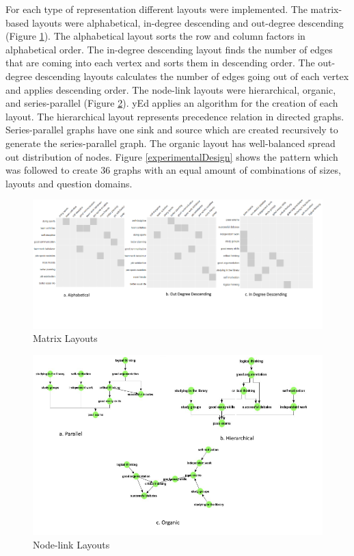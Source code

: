 \documentclass{l4proj}
\begin{document}
For each type of representation different layouts were implemented. The matrix-based layouts were alphabetical, in-degree descending and out-degree descending (Figure \ref{matrixLayout}). The alphabetical layout sorts the row and column factors in alphabetical order. The in-degree descending layout finds the number of edges that are coming into each vertex and sorts them in descending order. The out-degree descending layouts calculates the number of edges going out of each vertex and applies descending order.  The node-link layouts were hierarchical, organic, and series-parallel (Figure \ref{nodeLayouts}). yEd applies an algorithm for the creation of each layout. The hierarchical layout represents precedence relation in directed graphs. Series-parallel graphs have one sink and source which are created recursively to generate the series-parallel graph. The organic layout has well-balanced spread out distribution of nodes. Figure \ref{experimentalDesign} shows the pattern which was followed to create 36 graphs with an equal amount of combinations of sizes, layouts and question domains. 

\begin{figure}[h]
\centering
\includegraphics[width=18cm]{images/matrixLayout.png}
\caption{Matrix Layouts}
\label{matrixLayout}
\end{figure}

\begin{figure}[h]
\centering
\includegraphics[width=15cm]{images/nodeLayouts.png}
\caption{Node-link Layouts}
\label{nodeLayouts}
\end{figure}
\end{document}
